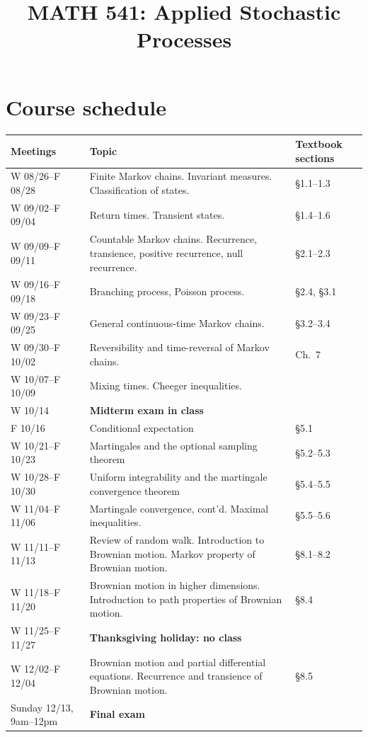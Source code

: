 \documentclass[11pt]{article}
\title{\textbf{MATH 541: Applied Stochastic Processes}}
\author{}
\date{}
\theoremstyle{definition}
\theoremstyle{remark}
\begin{document}
\maketitle

\section*{Course schedule}

\begingroup
\setlength{\parskip}{0pt}
\renewcommand{\arraystretch}{1.2}
\noindent
\begin{tabularx}{\textwidth}{@{} >{\raggedright\arraybackslash}p{}
                                 >{\raggedright\arraybackslash}X
                                 >{\raggedright\arraybackslash}p{} @{}}
\toprule
\textbf{Meetings} & \textbf{Topic} & \textbf{Textbook sections} \\
\midrule
W 08/26--F 08/28 & Finite Markov chains. Invariant measures. Classification of states. & \S1.1--1.3 \\
W 09/02--F 09/04 & Return times. Transient states. & \S1.4--1.6 \\
W 09/09--F 09/11 & Countable Markov chains. Recurrence, transience, positive recurrence, null recurrence. & \S2.1--2.3 \\
W 09/16--F 09/18 & Branching process, Poisson process. & \S2.4, \S3.1 \\
W 09/23--F 09/25 & General continuous-time Markov chains. & \S3.2--3.4 \\
W 09/30--F 10/02 & Reversibility and time-reversal of Markov chains. & Ch.\ 7 \\
W 10/07--F 10/09 & Mixing times. Cheeger inequalities. & \\
\midrule
W 10/14 & \textbf{Midterm exam in class} & \\
\midrule
F 10/16 & Conditional expectation & \S5.1 \\
W 10/21--F 10/23 & Martingales and the optional sampling theorem & \S5.2--5.3 \\
W 10/28--F 10/30 & Uniform integrability and the martingale convergence theorem & \S5.4--5.5 \\
W 11/04--F 11/06 & Martingale convergence, cont'd. Maximal inequalities. & \S5.5--5.6 \\
W 11/11--F 11/13 & Review of random walk. Introduction to Brownian motion. Markov property of Brownian motion. & \S8.1--8.2 \\
W 11/18--F 11/20 & Brownian motion in higher dimensions. Introduction to path properties of Brownian motion. & \S8.4 \\
\midrule
W 11/25--F 11/27 & \textbf{Thanksgiving holiday: no class} & \\
\midrule
W 12/02--F 12/04 & Brownian motion and partial differential equations. Recurrence and transience of Brownian motion. & \S8.5 \\
\midrule
Sunday 12/13, 9am--12pm & \textbf{Final exam} & \\
\bottomrule
\end{tabularx}
\endgroup
\end{document}
